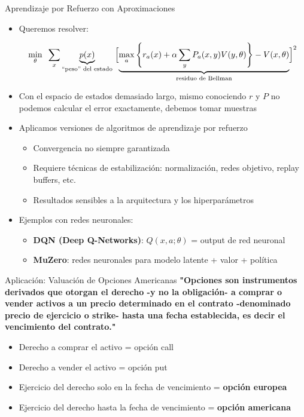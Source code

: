 \documentclass[handout]{beamer}
\begin{document}
\begin{frame}{Aprendizaje por Refuerzo con Aproximaciones}
\begin{itemize}
\item Queremos resolver:
\begin{small}
  \[
     \min_\theta \;\;\sum_x
     \underbrace{p(x)}_{\text{“peso” del estado}}\;
     \Bigl[\underbrace{\max_a\left\{r_a(x)+\alpha\sum_y P_a(x,y)V(y,\theta)\right\}-V(x,\theta)}_{\text{residuo de Bellman}}\Bigr]^2
  \]
  \end{small}
\item<2-> Con el espacio de estados demasiado largo, mismo conociendo $r$ y $P$ no podemos calcular el error exactamente, debemos tomar muestras
\item<3-> Aplicamos versiones de algoritmos de aprendizaje por refuerzo 
\begin{itemize}
\item<4-> Convergencia no siempre garantizada
\item<5-> Requiere técnicas de estabilización: normalización, redes objetivo, replay buffers, etc.
\item<6-> Resultados sensibles a la arquitectura y los hiperparámetros
\end{itemize}
\item<7->Ejemplos con redes neuronales:
\begin{itemize}
\item<8-> \textbf{DQN (Deep Q-Networks)}: \( Q(x,a;\theta) \) = output de red neuronal
\item<9-> \textbf{MuZero}: redes neuronales para modelo latente + valor + política
\end{itemize}
\end{itemize}
\end{frame}


\begin{frame}{Aplicación: Valuación de Opciones Americanas}
\textbf{"Opciones son instrumentos derivados que otorgan el derecho -y no la obligación-  a comprar o vender activos a un precio determinado en el contrato -denominado precio de ejercicio o strike- hasta una fecha establecida, es decir el vencimiento del contrato."}
\begin{itemize}
\item<2-> Derecho a comprar el activo = opción call
\item<3-> Derecho a vender el activo = opción put
\item<4-> Ejercicio del derecho solo en la fecha de vencimiento = \textbf{opción europea}
\item<5-> Ejercicio del derecho hasta la fecha de vencimiento = \textbf{opción americana}
\end{itemize}    
\end{frame}
\end{document}

